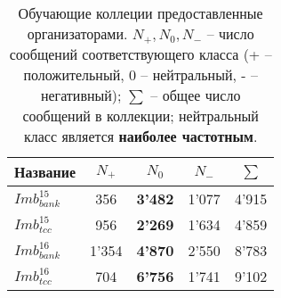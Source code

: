 \begin{table}[htp!]
\caption{Обучающие коллеции предоставленные организаторами.
        {\bf $N_+, N_0, N_-$} -- число сообщений соответствующего класса
    (+ -- положительный, 0 -- нейтральный, - -- негативный);
        {\bf $\sum$} -- общее число сообщений в коллекции;
        нейтральный класс является {\bf наиболее частотным}.
    }
\label{table:trainCollections}
\centering
\begin{tabular}{lcccc}
\hline
Название          & $N_+$ & $N_0$          & $N_-$ & $\sum$ \\ \hline
$Imb_{bank}^{15}$ & 356   & \textbf{3'482} & 1'077 & 4'915  \\
$Imb_{tcc}^{15}$  & 956   & \textbf{2'269} & 1'634 & 4'859  \\
$Imb_{bank}^{16}$ & 1'354 & \textbf{4'870} & 2'550 & 8'783  \\
$Imb_{tcc}^{16}$  & 704   & \textbf{6'756} & 1'741 & 9'102  \\ \hline
\end{tabular}
\end{table}
